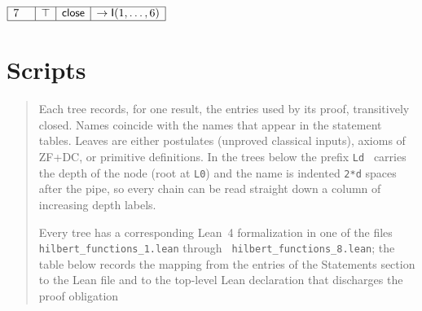 \documentclass[11pt,reqno]{amsart}
\begin{document}
\nointerlineskip\noindent$%
\begin{array}{|m{0.5cm}|l|r|c|}
\hline
7 & \top & \mathsf{close} & \to\mathsf{I}(1,\dots,6) \\ \hline
\end{array}%
$

\section{Scripts}

\begin{quotation}
\label{sec:scripts}%
\noindent
\noindent Each tree records, for one result, the entries used by its proof,
transitively closed. Names coincide with the names that appear in the
statement tables. Leaves are either postulates (unproved classical inputs),
axioms of \textsf{ZF+DC}, or primitive definitions. In the trees below the
prefix \verb|Ld | carries the depth of the node (root at \verb|L0|) and the
name is indented \verb|2*d| spaces after the pipe, so every chain can be
read straight down a column of increasing depth labels.

\medskip \noindent Every tree has a corresponding Lean~4 formalization in
one of the files \texttt{hilbert\_functions\_1.lean} through \texttt{%
hilbert\_functions\_8.lean}; the table below records the mapping from the
entries of the Statements section to the Lean file and to the top-level Lean
declaration that discharges the proof obligation
\end{quotation}
\end{document}
